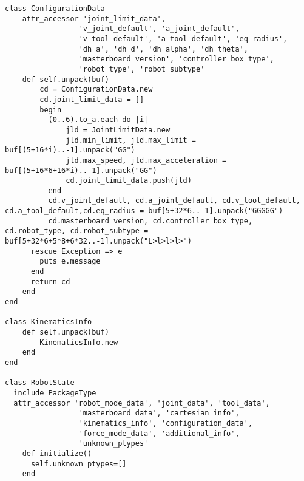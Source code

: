 \documentclass[
a4paper,
12pt,
oneside,
headsepline,		%
footsepline,		%
]{scrbook}
\begin{document}
\begin{lstlisting}
class ConfigurationData
    attr_accessor 'joint_limit_data',
                 'v_joint_default', 'a_joint_default', 
                 'v_tool_default', 'a_tool_default', 'eq_radius',
                 'dh_a', 'dh_d', 'dh_alpha', 'dh_theta',
                 'masterboard_version', 'controller_box_type',
                 'robot_type', 'robot_subtype'
    def self.unpack(buf)
        cd = ConfigurationData.new
        cd.joint_limit_data = []
        begin
          (0..6).to_a.each do |i|
              jld = JointLimitData.new
              jld.min_limit, jld.max_limit = buf[(5+16*i)..-1].unpack("GG")
              jld.max_speed, jld.max_acceleration = buf[(5+16*6+16*i)..-1].unpack("GG")
              cd.joint_limit_data.push(jld)
          end
          cd.v_joint_default, cd.a_joint_default, cd.v_tool_default, cd.a_tool_default,cd.eq_radius = buf[5+32*6..-1].unpack("GGGGG")
          cd.masterboard_version, cd.controller_box_type, cd.robot_type, cd.robot_subtype = buf[5+32*6+5*8+6*32..-1].unpack("L>l>l>l>")
      rescue Exception => e
        puts e.message
      end
      return cd
    end
end

class KinematicsInfo
    def self.unpack(buf)
        KinematicsInfo.new
    end
end

class RobotState
  include PackageType
  attr_accessor 'robot_mode_data', 'joint_data', 'tool_data',
                 'masterboard_data', 'cartesian_info',
                 'kinematics_info', 'configuration_data',
                 'force_mode_data', 'additional_info',
                 'unknown_ptypes'
    def initialize()
      self.unknown_ptypes=[]
    end


\end{lstlisting}
\end{document}
